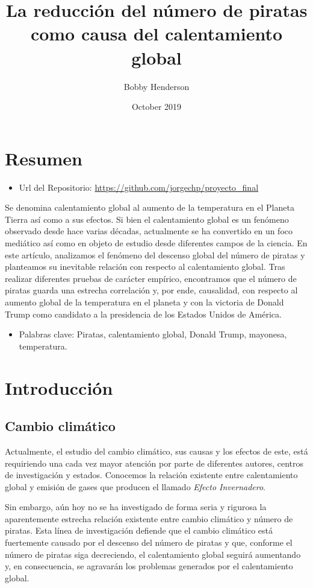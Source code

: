 \documentclass{article}
\title{La reducción del número de piratas como causa del calentamiento global}
\author{Bobby Henderson}
\date{October 2019}
\begin{document}
\maketitle

\section{Resumen}

\begin{itemize}
    \item Url del Repositorio: \url{https://github.com/jorgechp/proyecto_final}
\end{itemize}

Se denomina calentamiento global al aumento de la temperatura en el Planeta Tierra así como a sus efectos. Si bien el calentamiento global es un fenómeno observado desde hace varias décadas, actualmente se ha convertido en un foco mediático así como en objeto de estudio desde diferentes campos de la ciencia. En este artículo, analizamos el fenómeno del descenso global del número de piratas y planteamos su inevitable relación con respecto al calentamiento global. Tras realizar diferentes pruebas de carácter empírico, encontramos que el número de piratas guarda una estrecha correlación y, por ende, causalidad, con respecto al aumento global de la temperatura en el planeta y con la victoria de Donald Trump como candidato a la presidencia de los Estados Unidos de América. 

\begin{itemize}
	\item Palabras clave: Piratas, calentamiento global, Donald Trump, mayonesa, temperatura.
\end{itemize}

\section{Introducción}
\subsection{Cambio climático}

Actualmente, el estudio del cambio climático, sus causas y los efectos de este, está requiriendo una cada vez mayor atención por parte de diferentes autores, centros de investigación y estados. Conocemos la relación existente entre calentamiento global y emisión de gases que producen el llamado \emph{Efecto Invernadero}. 

Sin embargo, aún hoy no se ha investigado de forma seria y rigurosa la aparentemente estrecha relación existente entre cambio climático y número de piratas. Esta línea de investigación defiende que el cambio climático está fuertemente causado por el descenso del número de piratas y que, conforme el número de piratas siga decreciendo, el calentamiento global seguirá aumentando y, en consecuencia, se agravarán los problemas generados por el calentamiento global.
\end{document}
